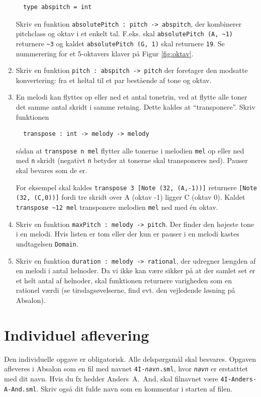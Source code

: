 \documentclass[a4paper,12pt]{article}
\begin{document}
\begin{enumerate}[{4G}1]
\begin{lstlisting}
  type abspitch = int
\end{lstlisting}

Skriv en funktion \lstinline{absolutePitch : pitch -> abspitch}, der
kombinerer pitchclass og oktav i et enkelt tal. F.eks. skal
\lstinline{absolutePitch (A, ~1)} returnere \lstinline{~3} og kaldet
\lstinline{absolutePitch (G, 1)} skal returnere \lstinline{19}. Se nummerering
for et 5-oktavers klaver på Figur \ref{fig:oktav}.

\item Skriv en funktion \lstinline{pitch : abspitch -> pitch} der foretager den
  modsatte konvertering: fra et heltal til et par bestående af tone og
  oktav.

\item En melodi kan flyttes op eller ned et antal tonetrin, ved at
  flytte alle toner det samme antal skridt i samme retning. Dette
  kaldes at "`transponere"'.  Skriv funktionen
\begin{lstlisting}
  transpose : int -> melody -> melody
\end{lstlisting}
  sådan at \lstinline{transpose n mel} flytter alle tonerne i melodien
  \lstinline{mel} op eller ned med \lstinline{n} skridt (negativt
  \lstinline{n} betyder at tonerne skal transponeres ned).  Pauser
  skal bevares som de er.

  For eksempel skal kaldes \lstinline{transpose 3 [Note (32, (A,-1))]}
  returnere \lstinline{[Note (32, (C,0))]} fordi tre skridt over A
  (oktav -1) ligger C (oktav 0). Kaldet \lstinline{transpose ~12 mel}
  transponere melodien \lstinline{mel} ned med én oktav.

\item Skriv en funktion \lstinline{maxPitch : melody -> pitch}. Der
  finder den højeste tone i en melodi. Hvis listen er tom eller der
  kun er pauser i en melodi kastes undtagelsen \lstinline{Domain}.

\item Skriv en funktion \lstinline{duration : melody -> rational}, der
  udregner længden af en melodi i antal helnoder. Da vi ikke kan være
  sikker på at der samlet set er et helt antal af helnoder, skal
  funktionen returnere varigheden som en rationel værdi (se
  tirsdagsøvelserne, find evt. den vejledende løsning på Absalon).
\end{enumerate}


\newpage
\section{Individuel aflevering}
\label{sec:indiv-aflev}
Den individuelle opgave er obligatorisk.  Alle delspørgsmål skal
besvares.  Opgaven afleveres i Absalon som en fil med navnet
\texttt{4I-\textit{navn}.sml}, hvor \texttt{\textit{navn}} er
erstatttet med dit navn. Hvis du fx hedder Anders~A.~And, skal
filnavnet være \texttt{4I-Anders-A-And.sml}. Skriv også dit fulde navn
som en kommentar i starten af filen.
\end{document}
